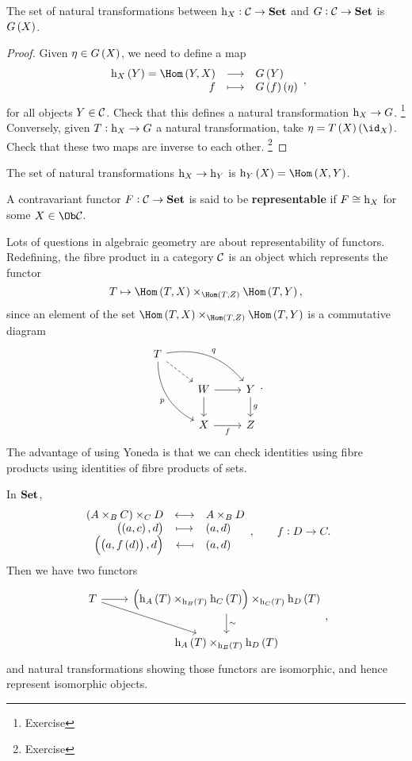 \begin{lemma}
The set of natural transformations between $ \mathrm{h}_X : \mathcal{C} \to \textbf{Set} $ and $ G : \mathcal{C} \to \textbf{Set} $ is $ G\br{X} $.
\end{lemma}

\begin{proof}
Given $ \eta \in G\br{X} $, we need to define a map
$$ \function{\h_X\br{Y} = \Hom\br{Y, X}}{G\br{Y}}{f}{G\br{f}\br{\eta}}, $$
for all objects $ Y \in \mathcal{C} $. Check that this defines a natural transformation $ \mathrm{h}_X \to G $. \footnote{Exercise} Conversely, given $ T : \mathrm{h}_X \to G $ a natural transformation, take $ \eta = T\br{X}\br{\id_X} $. Check that these two maps are inverse to each other. \footnote{Exercise}
\end{proof}

\begin{corollary}
The set of natural transformations $ \mathrm{h}_X \to \mathrm{h}_Y $ is $ \h_Y\br{X} = \Hom\br{X, Y} $.
\end{corollary}

\pagebreak

\begin{definition*}
A contravariant functor $ F : \mathcal{C} \to \textbf{Set} $ is said to be \textbf{representable} if $ F \cong \mathrm{h}_X $ for some $ X \in \Ob \CCC $.
\end{definition*}

Lots of questions in algebraic geometry are about representability of functors. Redefining, the fibre product in a category $ \mathcal{C} $ is an object which represents the functor
$$ T \mapsto \Hom\br{T, X} \times_{\Hom\br{T, Z}} \Hom\br{T, Y}, $$
since an element of the set $ \Hom\br{T, X} \times_{\Hom\br{T, Z}} \Hom\br{T, Y} $ is a commutative diagram
$$
\begin{tikzcd}
T \arrow[dashed]{dr} \arrow[bend left=30]{drr}{q} \arrow[bend right=30]{ddr}[swap]{p} & & \\
& W \arrow{r} \arrow{d} & Y \arrow{d}{g} \\
& X \arrow{r}[swap]{f} & Z
\end{tikzcd}.
$$
The advantage of using Yoneda is that we can check identities using fibre products using identities of fibre products of sets.

\begin{example*}
In $ \textbf{Set} $,
$$ \bijection{\br{A \times_B C} \times_C D}{A \times_B D}{\br{\br{a, c}, d}}{\br{a, d}}{\br{\br{a, f\br{d}}, d}}{\br{a, d}}, \qquad f : D \to C. $$
Then we have two functors
$$
\begin{tikzcd}
T \arrow{r} \arrow{dr} & \br{\h_A\br{T} \times_{\h_B\br{T}} \h_C\br{T}} \times_{\h_C\br{T}} \h_D\br{T} \arrow{d}{\sim} \\
& \h_A\br{T} \times_{\h_B\br{T}} \h_D\br{T}
\end{tikzcd},
$$
and natural transformations showing those functors are isomorphic, and hence represent isomorphic objects.
\end{example*}

